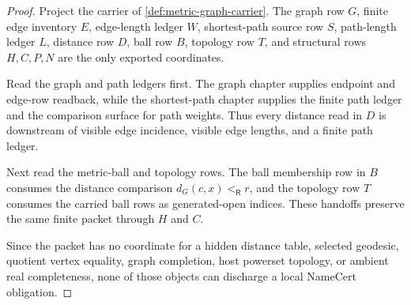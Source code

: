 \begin{proof}
Project the carrier of \autoref{def:metric-graph-carrier}. The graph row $G$, finite edge inventory $E$, edge-length ledger $W$, shortest-path source row $S$, path-length ledger $L$, distance row $D$, ball row $B$, topology row $T$, and structural rows $H,C,P,N$ are the only exported coordinates.

Read the graph and path ledgers first. The graph chapter supplies endpoint and edge-row readback, while the shortest-path chapter supplies the finite path ledger and the comparison surface for path weights. Thus every distance read in $D$ is downstream of visible edge incidence, visible edge lengths, and a finite path ledger.

Next read the metric-ball and topology rows. The ball membership row in $B$ consumes the distance comparison $d_G(c,x)<_{\mathsf R}r$, and the topology row $T$ consumes the carried ball rows as generated-open indices. These handoffs preserve the same finite packet through $H$ and $C$.

Since the packet has no coordinate for a hidden distance table, selected geodesic, quotient vertex equality, graph completion, host powerset topology, or ambient real completeness, none of those objects can discharge a local NameCert obligation.
\end{proof}

